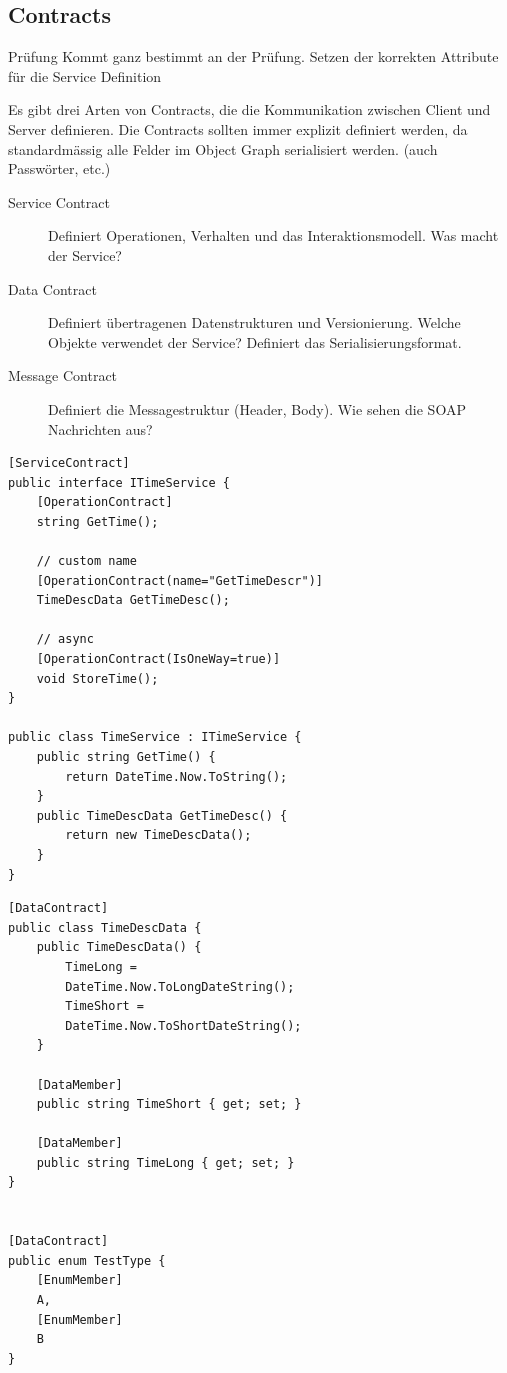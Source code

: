 \clearpage

\subsection{Contracts}
\begin{hint}{Prüfung}{}
	Kommt ganz bestimmt an der Prüfung. Setzen der korrekten Attribute für die Service Definition
\end{hint}
Es gibt drei Arten von Contracts, die die Kommunikation zwischen Client und Server definieren. Die Contracts sollten immer explizit definiert werden, da standardmässig alle Felder im Object Graph serialisiert werden. (auch Passwörter, etc.)
\begin{description}
	\item[Service Contract] Definiert Operationen, Verhalten und das Interaktionsmodell. Was macht der Service?
	\item[Data Contract] Definiert übertragenen Datenstrukturen und Versionierung. Welche Objekte verwendet der Service? Definiert das Serialisierungsformat.
	\item[Message Contract] Definiert die Messagestruktur (Header, Body). Wie sehen die SOAP Nachrichten aus?
\end{description}
\begin{lstlisting}[caption=Service Contract]
[ServiceContract]
public interface ITimeService {
	[OperationContract]
	string GetTime();

	// custom name
	[OperationContract(name="GetTimeDescr")]
	TimeDescData GetTimeDesc();
	
	// async
	[OperationContract(IsOneWay=true)]
	void StoreTime();
}

public class TimeService : ITimeService {
	public string GetTime() { 
		return DateTime.Now.ToString(); 
	}
	public TimeDescData GetTimeDesc() { 
		return new TimeDescData();
	}
}
\end{lstlisting}

\begin{lstlisting}[caption=Data Contract]
[DataContract]
public class TimeDescData {
	public TimeDescData() {
		TimeLong =
		DateTime.Now.ToLongDateString();
		TimeShort =
		DateTime.Now.ToShortDateString();
	}
	
	[DataMember]
	public string TimeShort { get; set; }
	
	[DataMember]
	public string TimeLong { get; set; }
}


[DataContract]
public enum TestType {
	[EnumMember]
	A,
	[EnumMember]
	B
}
\end{lstlisting}

